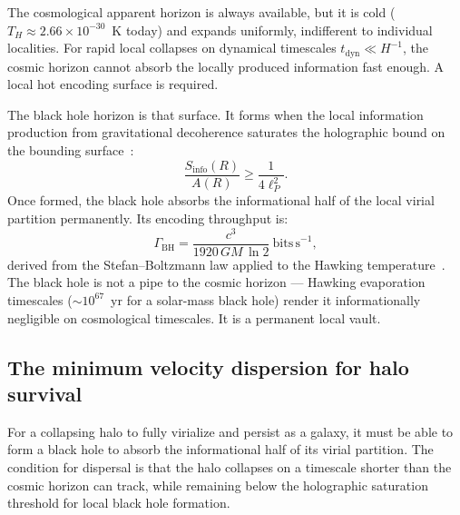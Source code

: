 \documentclass[12pt,a4paper]{article}
\begin{document}
The cosmological apparent horizon is always available, but it is cold
($T_H \approx 2.66 \times 10^{-30}$~K today) and expands uniformly,
indifferent to individual localities. For rapid local collapses on
dynamical timescales $t_\mathrm{dyn} \ll H^{-1}$, the cosmic horizon
cannot absorb the locally produced information fast enough. A local hot
encoding surface is required.

The black hole horizon is that surface. It forms when the local information
production from gravitational decoherence saturates the holographic bound
on the bounding surface~\citep{IAM_BH}:
\begin{equation}
\frac{S_\mathrm{info}(R)}{A(R)} \geq \frac{1}{4\ell_P^2}.
\label{eq:saturation}
\end{equation}
Once formed, the black hole absorbs the informational half of the local
virial partition permanently. Its encoding throughput is:
\begin{equation}
\Gamma_\mathrm{BH} = \frac{c^3}{1920\,G M\,\ln 2}\ \mathrm{bits\,s}^{-1},
\label{eq:throughput}
\end{equation}
derived from the Stefan--Boltzmann law applied to the Hawking
temperature~\citep{IAM_BH}. The black hole is not a pipe to the cosmic
horizon --- Hawking evaporation timescales ($\sim 10^{67}$~yr for a
solar-mass black hole) render it informationally negligible on
cosmological timescales. It is a permanent local vault.

\subsection{The minimum velocity dispersion for halo survival}

For a collapsing halo to fully virialize and persist as a galaxy, it must
be able to form a black hole to absorb the informational half of its
virial partition. The condition for dispersal is that the halo collapses
on a timescale shorter than the cosmic horizon can track, while remaining
below the holographic saturation threshold for local black hole formation.
\end{document}
